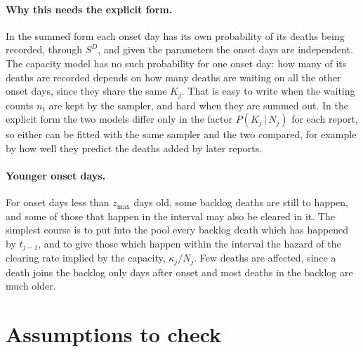 \documentclass[11pt,a4paper]{article}
\newcommand{\given}{\,|\,}
\begin{document}
\paragraph{Why this needs the explicit form.} In the summed form each onset
day has its own probability of its deaths being recorded, through
$S^{D}$, and given the parameters the onset days are independent. The
capacity model has no such probability for one onset day: how many of its
deaths are recorded depends on how many deaths are waiting on all the other
onset days, since they share the same $K_j$. That is easy to write when the
waiting counts $n_t$ are kept by the sampler, and hard when they are summed
out. In the explicit form the two models differ only in the factor
$P(K_j\given N_j)$ for each report, so either can be fitted with the same
sampler and the two compared, for example by how well they predict the
deaths added by later reports.

\paragraph{Younger onset days.} For onset days less than $z_{\max}$ days old,
some backlog deaths are still to happen, and some of those that happen in
the interval may also be cleared in it. The simplest course is to put into
the pool every backlog death which has happened by $t_{j-1}$, and to give
those which happen within the interval the hazard of the clearing rate
implied by the capacity, $\kappa_j/N_j$. Few deaths are affected, since a
death joins the backlog only days after onset and most deaths in the
backlog are much older.

\section{Assumptions to check}\label{sec:assumptions}
\end{document}
